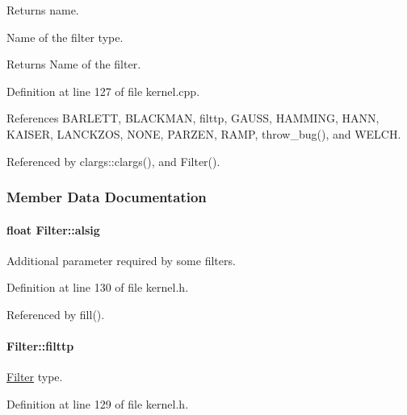 Returns name. 

Name of the filter type.

\begin{DoxyReturn}{Returns}
Name of the filter. 
\end{DoxyReturn}


Definition at line 127 of file kernel.cpp.



References BARLETT, BLACKMAN, filttp, GAUSS, HAMMING, HANN, KAISER, LANCKZOS, NONE, PARZEN, RAMP, throw\_\-bug(), and WELCH.



Referenced by clargs::clargs(), and Filter().



\subsubsection{Member Data Documentation}
\hypertarget{classFilter_af2d531fc1caba3f3c9c923a484da3722}{
\paragraph[{alsig}]{\setlength{\rightskip}{0pt plus 5cm}float {\bf Filter::alsig}}\hfill}
\label{classFilter_af2d531fc1caba3f3c9c923a484da3722}


Additional parameter required by some filters. 



Definition at line 130 of file kernel.h.



Referenced by fill().

\hypertarget{classFilter_a61675994b19b6e0a6823e18974dd72bb}{
\paragraph[{filttp}]{ {\bf Filter::filttp}}\hfill}
\label{classFilter_a61675994b19b6e0a6823e18974dd72bb}


\hyperlink{classFilter}{Filter} type. 



Definition at line 129 of file kernel.h.



